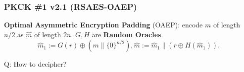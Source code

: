 \begin{comment}
\begin{frame}\frametitle{PKCS \#1 v1.5 (RSAES-PKCS1-v1\_5)}
\textbf{Public-Key Cryptography Standard (PKCS) \#1 version 1.5}:
\begin{itemize}
\item $N$ has $k$ bytes, $2^{8(k-1)} \le N < 2^{8k}$.
\item Message $m$ has $D (\le k-11)$ bytes.
\item Random pad $r$ has $(k-D-3)$ bytes without $\{0\}^8$.
\item The ciphertext:
\end{itemize}
\[[(\{0\}^8\|\{0\}^610\|r\|\{0\}^8\|m)^e \bmod N]\] 
\textbf{Security}: PKCS \#1 v1.5 is believed to be CPA-secure, although no proof based on the RSA assumption has ever been shown.
\end{frame}
\begin{frame}\frametitle{Attack on PKCS \#1 v1.5}
\textbf{PKCS \#1 v1.5 used in HTTPS}:\\
if the first 16 bits of message is not ``02'' which is standing for ``PKCK \#1'', then the web server returns error.\newline

\textbf{CCA to infer the message $m$ of ciphertext $c$}:
\begin{enumerate}
\item choose a string $r$, compute $c' \gets r^e\cdot c = (r\cdot \mathsf{PKCS1}(m))^e$.
\item send $c'$ to the web server. If the server does not return error, some bits of $m$ can be learned.
\item change $r$ and learn other bits of $m$.
\end{enumerate}

\textbf{HTTPS Defense} [RFC 5246]: if not ``02'', set the message as a random string.
\end{frame}
\end{comment}

\begin{frame}\frametitle{PKCK \#1 v2.1 (RSAES-OAEP)}
\textbf{Optimal Asymmetric Encryption Padding} (OAEP): encode $m$ of length $n/2$ as $\hat{m}$ of length $2n$. $G, H$ are \textbf{Random Oracles}.
\[ \hat{m}_1 := G(r)\oplus (m\| \{0\}^{n/2}), \hat{m} := \hat{m}_1 \| (r \oplus H(\hat{m}_1)).\]
\begin{figure}
\begin{center}

\end{center}
\end{figure}
\alert{Q: How to decipher?}
\end{frame}

